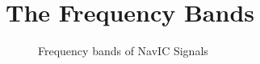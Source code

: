




%


\section{The Frequency Bands}
	\begin{figure}[!ht]
	\centering
	
	\caption{Frequency bands of NavIC Signals}
	\label{figure:bandsfig}
	\end{figure}

